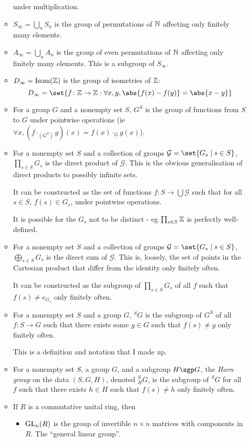 \documentclass[a4paper,12pt]{article}
\begin{document}
\begin{enumerate}[leftmargin=*]
\begin{itemize}
    under multiplication.
   \item
    \(S_\infty = \bigcup_n S_n\) is the group of permutations of \(\mathbb N\)
    affecting only finitely many elements.
   \item
    \(A_\infty = \bigcup_n A_n\) is the group of even permutations of \(\mathbb N\)
    affecting only finitely many elements. This is a subgroup of \(S_\infty\).
   \item
    \(D_\infty = \operatorname{Isom}(\mathbb Z)\) is the group of isometries of \(\mathbb Z\):
    \begin{equation*}
     D_\infty
       = \set{f\colon \Z \to \Z: \forall x, y, \abs{f(x) - f(y)} = \abs{x - y}}
    \end{equation*}
   \item
    For a group \(G\) and a nonempty set \(S\), \(G^S\) is the group of
    functions from \(S\) to \(G\) under pointwise operations
    (ie \(\forall x, (f \cdot_{(G^S)} g)(x) = f(x) \cdot_G g(x)\)).
   \item
    For a nonempty set \(S\) and a collection of groups
    \(\mathcal G = \set{G_s \mid s \in S}\), \(\prod_{s \in S} G_s\) is the
    direct product of \(\mathcal G\). This is the obvious generalisation of
    direct products to possibly infinite sets.

    It can be constructed as the set of functions
    \(f: S \to \bigcup \mathcal G\) such that for all \(s \in S\),
    \(f(s) \in G_s\), under pointwise operations.

    It is possible for the \(G_s\) not to be distinct - eg
    \(\prod_{s \in S} \mathbb Z\) is perfectly well-defined.
   \item
    For a nonempty set \(S\) and a collection of groups
    \(\mathcal G = \set{G_s \mid s \in S}\), \(\bigoplus_{s \in S} G_s\) is the
    direct sum of \(\mathcal G\). This is, loosely, the set of points in the
    Cartesian product that differ from the identity only finitely often.

    It can be constructed as the subgroup of \(\prod_{s \in S} G_s\) of all
    \(f\) such that \(f(s) \ne e_{G_s}\) only finitely often.
   \item
    For a nonempty set \(S\) and a group \(G\), \({}^SG\) is the subgroup of
    \(G^S\) of all \(f: S \to G\) such that there exists some \(g \in G\) such
    that \(f(s) \ne g\) only finitely often.

    This is a definition and notation that I made up.
   \item
    For a nonempty set \(S\), a group \(G\), and a subgroup \(H \sgp G\), the
    \emph{Horn group} on the data \((S, G, H)\), denoted
    \({}_H^S G\), is the subgroup of \({}^S G\) for all \(f\) such that there
    exists \(h \in H\) such that \(f(s) \ne h\) only finitely often.
   \item
    If \(R\) is a commutative unital ring, then
    \begin{itemize}
     \item
      \(\mathrm{GL}_n(R)\) is the group of invertible \(n \times n\) matrices
      with components in \(R\). The ``general linear group''.


\end{itemize}
\end{itemize}
\end{enumerate}
\end{document}
